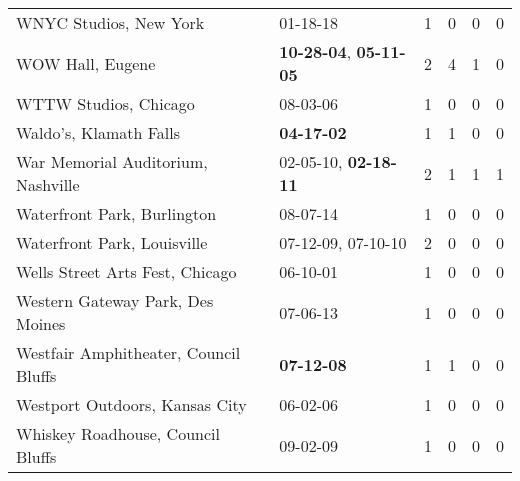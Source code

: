 \begin{longtable}{p{}p{}p{}p{}p{}p{}}
                                                       WNYC Studios, New York &                                                01-18-18\textsuperscript{} &  1 &  0 &  0 &  0 \\
                                                             WOW Hall, Eugene &  \textbf{10-28-04\textsuperscript{}}, \textbf{05-11-05\textsuperscript{}} &  2 &  4 &  1 &  0 \\
                                                        WTTW Studios, Chicago &                                                08-03-06\textsuperscript{} &  1 &  0 &  0 &  0 \\
                                                       Waldo's, Klamath Falls &                                       \textbf{04-17-02\textsuperscript{}} &  1 &  1 &  0 &  0 \\
                                           War Memorial Auditorium, Nashville &           02-05-10\textsuperscript{}, \textbf{02-18-11\textsuperscript{}} &  2 &  1 &  1 &  1 \\
                                                  Waterfront Park, Burlington &                                                08-07-14\textsuperscript{} &  1 &  0 &  0 &  0 \\
                                                  Waterfront Park, Louisville &                    07-12-09\textsuperscript{}, 07-10-10\textsuperscript{} &  2 &  0 &  0 &  0 \\
                                              Wells Street Arts Fest, Chicago &                                                06-10-01\textsuperscript{} &  1 &  0 &  0 &  0 \\
                                             Western Gateway Park, Des Moines &                                                07-06-13\textsuperscript{} &  1 &  0 &  0 &  0 \\
                                        Westfair Amphitheater, Council Bluffs &                                       \textbf{07-12-08\textsuperscript{}} &  1 &  1 &  0 &  0 \\
                                               Westport Outdoors, Kansas City &                                                06-02-06\textsuperscript{} &  1 &  0 &  0 &  0 \\
                                            Whiskey Roadhouse, Council Bluffs &                                                09-02-09\textsuperscript{} &  1 &  0 &  0 &  0 \\

\end{longtable}
